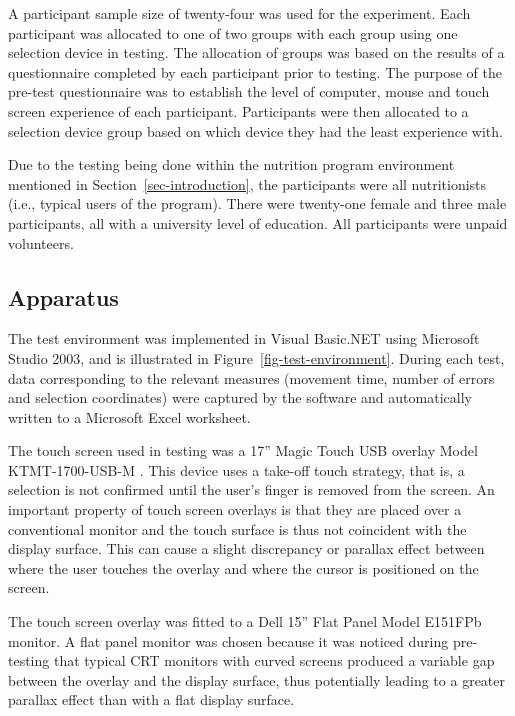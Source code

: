\documentclass{elsart}
\begin{document}
A participant sample size of twenty-four was used for the experiment.
Each participant was allocated to one of two groups with each group
using one selection device in testing. The allocation of groups was
based on the results of a questionnaire completed by each participant
prior to testing. The purpose of the pre-test questionnaire was to
establish the level of computer, mouse and touch screen experience of
each participant. Participants were then allocated to a selection device
group based on which device they had the least experience with.

Due to the testing being done within the nutrition program environment
mentioned in Section~\ref{sec-introduction}, the participants were all
nutritionists (i.e., typical users of the program). There were
twenty-one female and three male participants, all with a university
level of education. All participants were unpaid volunteers.


\subsection{Apparatus}
\label{sec-method-apparatus}

The test environment was implemented in Visual Basic.NET using Microsoft
Studio 2003, and is illustrated in Figure~\ref{fig-test-environment}.
During each test, data corresponding to the relevant measures (movement
time, number of errors and selection coordinates) were captured by the
software and automatically written to a Microsoft Excel worksheet.

The touch screen used in testing was a 17'' Magic Touch USB overlay
Model KTMT-1700-USB-M \citep{Keyt-2005-Touch}. This device uses a
take-off touch strategy, that is, a selection is not confirmed until the
user's finger is removed from the screen. An important property of touch
screen overlays is that they are placed over a conventional monitor and
the touch surface is thus not coincident with the display surface. This
can cause a slight discrepancy or parallax effect between where the user
touches the overlay and where the cursor is positioned on the screen.

The touch screen overlay was fitted to a Dell 15'' Flat Panel Model
E151FPb monitor. A flat panel monitor was chosen because it was noticed
during pre-testing that typical CRT monitors with curved screens
produced a variable gap between the overlay and the display surface,
thus potentially leading to a greater parallax effect than with a flat
display surface.
\end{document}
